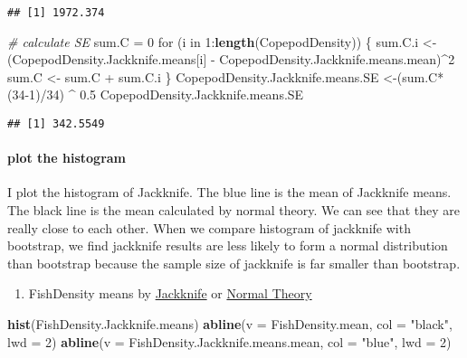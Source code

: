 \documentclass[]{article}
\newenvironment{Shaded}{\begin{snugshade}}{\end{snugshade}}
\newcommand{\KeywordTok}[1]{\textcolor[rgb]{0.13,0.29,0.53}{\textbf{{#1}}}}
\newcommand{\DataTypeTok}[1]{\textcolor[rgb]{0.13,0.29,0.53}{{#1}}}
\newcommand{\DecValTok}[1]{\textcolor[rgb]{0.00,0.00,0.81}{{#1}}}
\newcommand{\FloatTok}[1]{\textcolor[rgb]{0.00,0.00,0.81}{{#1}}}
\newcommand{\StringTok}[1]{\textcolor[rgb]{0.31,0.60,0.02}{{#1}}}
\newcommand{\CommentTok}[1]{\textcolor[rgb]{0.56,0.35,0.01}{\textit{{#1}}}}
\newcommand{\NormalTok}[1]{{#1}}
\providecommand{\tightlist}{%
  \setlength{\itemsep}{0pt}\setlength{\parskip}{0pt}}
\let\oldparagraph\paragraph
\renewcommand{\paragraph}[1]{\oldparagraph{#1}\mbox{}}
\begin{document}
\begin{verbatim}
## [1] 1972.374
\end{verbatim}

\begin{Shaded}
\begin{Highlighting}[]
\CommentTok{# calculate SE}
\NormalTok{sum.C =}\StringTok{ }\DecValTok{0}
\NormalTok{for (i in }\DecValTok{1}\NormalTok{:}\KeywordTok{length}\NormalTok{(CopepodDensity)) \{}
  \NormalTok{sum.C.i <-}\StringTok{ }\NormalTok{(CopepodDensity.Jackknife.means[i] -}\StringTok{ }\NormalTok{CopepodDensity.Jackknife.means.mean)^}\DecValTok{2}
  \NormalTok{sum.C <-}\StringTok{ }\NormalTok{sum.C +}\StringTok{ }\NormalTok{sum.C.i}
\NormalTok{\}}
\NormalTok{CopepodDensity.Jackknife.means.SE <-(sum.C*(}\DecValTok{34-1}\NormalTok{)/}\DecValTok{34}\NormalTok{) ^}\StringTok{ }\FloatTok{0.5}
\NormalTok{CopepodDensity.Jackknife.means.SE}
\end{Highlighting}
\end{Shaded}

\begin{verbatim}
## [1] 342.5549
\end{verbatim}

\paragraph{plot the histogram}\label{plot-the-histogram}

I plot the histogram of Jackknife. The blue line is the mean of
Jackknife means. The black line is the mean calculated by normal theory.
We can see that they are really close to each other. When we compare
histogram of jackknife with bootstrap, we find jackknife results are
less likely to form a normal distribution than bootstrap because the
sample size of jackknife is far smaller than bootstrap.

\begin{enumerate}
\def\labelenumi{(\arabic{enumi})}
\tightlist
\item
  FishDensity means by \href{blue}{Jackknife} or \href{black}{Normal
  Theory}
\end{enumerate}

\begin{Shaded}
\begin{Highlighting}[]
\KeywordTok{hist}\NormalTok{(FishDensity.Jackknife.means)}
\KeywordTok{abline}\NormalTok{(}\DataTypeTok{v =} \NormalTok{FishDensity.mean, }\DataTypeTok{col =} \StringTok{"black"}\NormalTok{, }\DataTypeTok{lwd =} \DecValTok{2}\NormalTok{)}
\KeywordTok{abline}\NormalTok{(}\DataTypeTok{v =} \NormalTok{FishDensity.Jackknife.means.mean, }\DataTypeTok{col =} \StringTok{"blue"}\NormalTok{, }\DataTypeTok{lwd =} \DecValTok{2}\NormalTok{)}
\end{Highlighting}
\end{Shaded}
\end{document}
